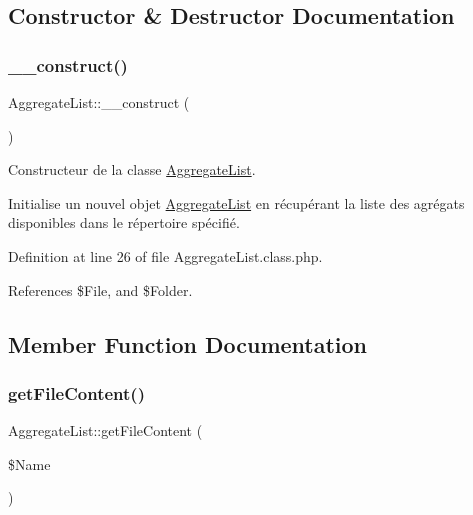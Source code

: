 \subsection{Constructor \& Destructor Documentation}
\mbox{\label{class_aggregate_list_aacb0c8f06040c9a462bbb39b0fe56dec}} 
\subsubsection{\texorpdfstring{\+\_\+\+\_\+construct()}{\_\_construct()}}
{\footnotesize\ttfamily Aggregate\+List\+::\+\_\+\+\_\+construct (\begin{DoxyParamCaption}{ }\end{DoxyParamCaption})}

Constructeur de la classe \hyperlink{class_aggregate_list}{Aggregate\+List}.

Initialise un nouvel objet \hyperlink{class_aggregate_list}{Aggregate\+List} en récupérant la liste des agrégats disponibles dans le répertoire spécifié. 

Definition at line 26 of file Aggregate\+List.\+class.\+php.



References \$\+File, and \$\+Folder.



\subsection{Member Function Documentation}
\mbox{\label{class_aggregate_list_a24c68fc9f46133f4e975621dd176e2e9}} 
\subsubsection{\texorpdfstring{get\+File\+Content()}{getFileContent()}}
{\footnotesize\ttfamily Aggregate\+List\+::get\+File\+Content (\begin{DoxyParamCaption}\item[{}]{\$\+Name }\end{DoxyParamCaption})}

